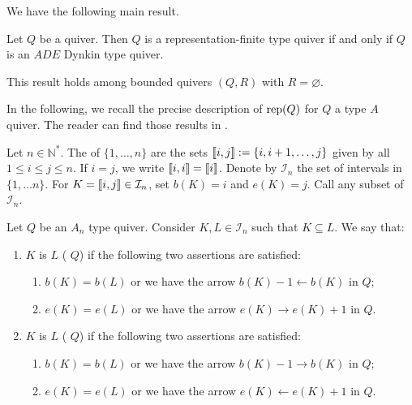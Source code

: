 We have the following main result.

\begin{theorem}[{\cite{G72}}] \label{thm:Gab} Let $Q$ be a quiver. Then $Q$ is a representation-finite type quiver if and only if $Q$ is an $ADE$ Dynkin type quiver.
\end{theorem}

\begin{remark}
    This result holds among bounded quivers $(Q,R)$ with $R = \varnothing$.
\end{remark}

In the following, we recall the precise description of $\operatorname{rep}(Q)$ for $Q$ a type $A$ quiver. The reader can find those results in \cite{S14}.
 
Let $n \in \mathbb{N}^*$. The  of $\{1, \ldots, n\}$ are the sets $\llbracket i,j \rrbracket := \{i, i+1, \ldots,j \}$ given by all $1 \leqslant i \leqslant j \leqslant n$. If $i=j$, we write $\llbracket i,i \rrbracket = \llbracket i \rrbracket$. Denote by $\mathcal{I}_n$ the set of intervals in $\{1, \ldots n\}$. For $K = \llbracket i,j \rrbracket \in \mathcal{I}_n$, set $b(K) = i$ and $e(K) = j$. Call  any subset of $\mathcal{I}_n$.
	\begin{definition}\label{def:intervalbotandtop}  Let $Q$ be an $A_n$ type quiver. Consider $K,L \in \mathcal{I}_n$ such that $K \subseteq L$. We say that:
		\begin{enumerate}[label = $\bullet$]
			\item $K$ is  $L$ ( $Q$) if the following two assertions are satisfied:\begin{enumerate}[label = $\bullet$]
				\item $b(K) = b(L)$ or we have the arrow $b(K)-1 \longleftarrow b(K)$ in $Q$;
				\item $e(K) = e(L)$ or we have the arrow $e(K) \longrightarrow e(K)+1$ in $Q$.
			\end{enumerate}
			\item $K$ is  $L$ ( $Q$) if the following two assertions are satisfied:\begin{enumerate}[label = $\bullet$]
				\item $b(K) = b(L)$ or we have the arrow $b(K)-1 \longrightarrow b(K)$ in $Q$;
				\item $e(K) =e(L)$ or we have the arrow $e(K) \longleftarrow e(K)+1$ in $Q$.
			\end{enumerate}
		\end{enumerate}
	\end{definition}
